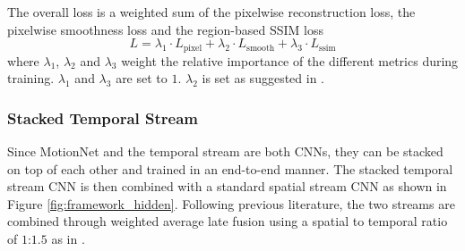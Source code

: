 \documentclass[sigconf]{acmart}
\begin{document}
	The overall loss is a weighted sum of the pixelwise reconstruction loss, the pixelwise smoothness loss and the region-based SSIM loss 
	\begin{equation}
		L = \lambda_{1} \cdot L_{\text{pixel}} + \lambda_{2} \cdot L_{\text{smooth}}  + \lambda_{3} \cdot L_{\text{ssim}}
		\label{eq:total_unsup_loss}
	\end{equation}
	where $\lambda_{1}$, $\lambda_{2}$ and $\lambda_{3}$ weight the relative importance of the different metrics during training. $\lambda_{1}$ and $\lambda_{3}$ are set to $1$. $\lambda_{2}$ is set as suggested in \cite{flownet}.
	
	\subsubsection{\textbf{Stacked Temporal Stream}}
	\label{sec:stacked_temporal_stream}
	Since MotionNet and the temporal stream are both CNNs, they can be stacked on top of each other and trained in an end-to-end manner.
	The stacked temporal stream CNN is then combined with a standard spatial stream CNN as shown in Figure \ref{fig:framework_hidden}. Following previous literature, the two streams are combined through weighted average late fusion using a spatial to temporal ratio of $1$:$1.5$ as in \cite{wanggoodpractice2015,TSN2016,diba_tle_2016}.
	
\end{document}
